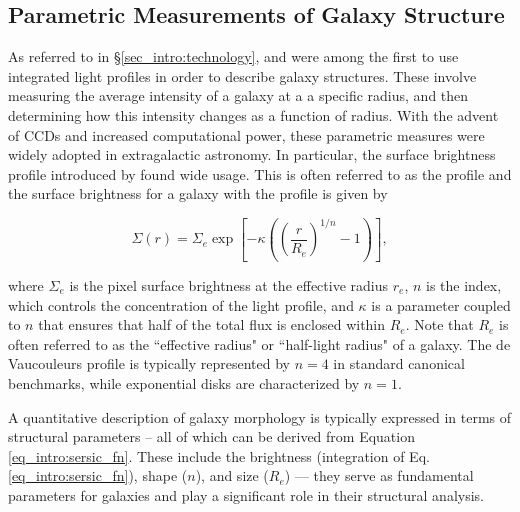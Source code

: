 \subsection{Parametric Measurements of Galaxy Structure} \label{sec_intro:parametric_measures}

As referred to in \S \ref{sec_intro:technology}, \citeauthor{de_vac_48} and \citeauthor{sersic_63} were among the first to use integrated light profiles in order to describe galaxy structures. These involve measuring the average intensity of a galaxy at a a specific radius, and then determining how this intensity changes as a function of radius. With the advent of CCDs and increased computational power, these parametric measures were widely adopted in extragalactic astronomy. In particular, the surface brightness profile introduced by \citet{sersic_63} found wide usage. This is often referred to as the \sersic{} profile and the surface brightness for a galaxy with the profile is given by

\begin{equation}
\label{eq_intro:sersic_fn}
\Sigma(r) = \Sigma_e \exp \left[ -\kappa \left( \left( \frac{r}{R_e}\right)^{1/n} - 1 \right) \right] ,
\end{equation}

where $\Sigma_e$ is the pixel surface brightness at the effective radius $r_e$, $n$ is the \sersic{} index, which controls the concentration of the light profile, and $\kappa$ is a parameter coupled to $n$ that ensures that half of the total flux is enclosed within $R_e$. Note that $R_e$ is often referred to as the ``effective radius" or ``half-light radius" of a galaxy. The de Vaucouleurs profile is typically represented by $n = 4$ in standard canonical benchmarks, while exponential disks are characterized by $n = 1$. 

A quantitative description of galaxy morphology is typically expressed in terms of structural parameters -- all of which can be derived from Equation \ref{eq_intro:sersic_fn}. These include the brightness (integration of Eq. \ref{eq_intro:sersic_fn}), shape ($n$), and size ($R_e$) --- they serve as fundamental parameters for galaxies and play a significant role in their structural analysis. 

